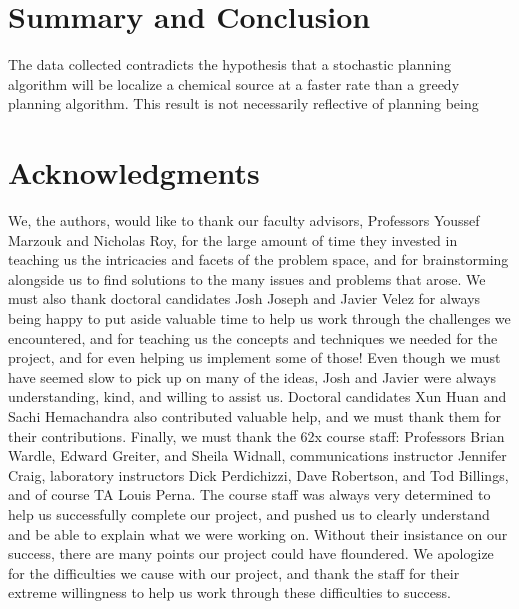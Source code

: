 \documentclass[submit, 12pt]{aiaa-pretty-modified}
\begin{document}
\section{Summary and Conclusion}
The data collected contradicts the hypothesis that a stochastic planning
algorithm will be localize a chemical source at a faster rate than a greedy
planning algorithm. This result is not necessarily reflective of planning being 


\section{Acknowledgments}
We, the authors, would like to thank our faculty advisors, Professors Youssef
Marzouk and Nicholas Roy, for the large amount of time they invested in teaching
us the intricacies and facets of the problem space, and for brainstorming
alongside us to find solutions to the many issues and problems that arose. We
must also thank doctoral candidates Josh Joseph and Javier Velez for always
being happy to put aside valuable time to help us work through the challenges we
encountered, and for teaching us the concepts and techniques we needed for the
project, and for even helping us implement some of those! Even though we must
have seemed slow to pick up on many of the ideas, Josh and Javier were always
understanding, kind, and willing to assist us. Doctoral candidates Xun Huan and
Sachi Hemachandra also contributed valuable help, and we must thank them for
their contributions. Finally, we must thank the 62x course staff: Professors
Brian Wardle, Edward Greiter, and Sheila Widnall, communications instructor
Jennifer Craig, laboratory instructors Dick Perdichizzi, Dave Robertson, and Tod
Billings, and of course TA Louis Perna. The course staff was always very
determined to help us successfully complete our project, and pushed us to
clearly understand and be able to explain what we were working on. Without their
insistance on our success, there are many points our project could have
floundered. We apologize for the difficulties we cause with our project, and
thank the staff for their extreme willingness to help us work through these
difficulties to success.

\newpage


\nocite{*}
\end{document}
